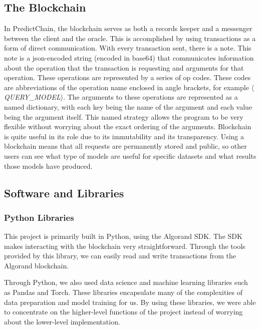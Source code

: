 \documentclass{ledger}
\begin{document}
\subsection{The Blockchain}

In PredictChain, the blockchain serves as both a records keeper and a messenger between the client and the oracle.
This is accomplished by using transactions as a form of direct communication.  With every transaction sent, there is a note.
This note is a json-encoded string (encoded in base64) that communicates information about the operation that the transaction
is requesting and arguments for that operation.  These operations are represented by a series
of op codes.  These codes are abbreviations of the operation name enclosed in angle brackets, for example $\langle$\textit{QUERY\_MODEL}$\rangle$.
The arguments to these operations are represented as a named dictionary, with each key being the name of the argument and each
value being the argument itself.  This named strategy allows the program to be very flexible without worrying about the exact
ordering of the arguments.  Blockchain is quite useful in its role due to its immutability and its transparency.  Using
a blockchain means that all requests are permanently stored and public, so other users can see what type of models are useful
for specific datasets and what results those models have produced.

\subsection{Software and Libraries}

\subsubsection*{Python Libraries}

This project is primarily built in Python, using the Algorand SDK.  The SDK makes interacting with the blockchain
very straightforward.  Through the tools provided by this library, we can easily read and write transactions from
the Algorand blockchain.

Through Python, we also used data science and machine learning libraries such as Pandas
and Torch.  These libraries encapsulate many of the complexities of data preparation and model training for us.
By using these libraries, we were able to concentrate on the higher-level functions of the project instead of worrying
about the lower-level implementation.
\end{document}
